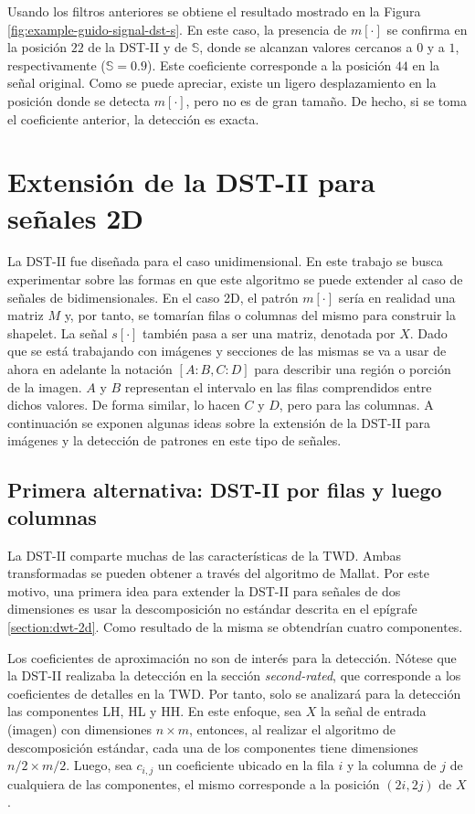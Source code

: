 Usando los filtros anteriores se obtiene el resultado mostrado en la Figura \ref{fig:example-guido-signal-dst-s}. 
En este caso, la presencia de $m[\cdot]$ se confirma en la posición $22$ de la DST-II y de $\mathbb{S}$, donde se alcanzan valores
cercanos a $0$ y a $1$, respectivamente ($\mathbb{S}=0.9$). Este coeficiente corresponde a la posición 
$44$ en la señal original. Como se puede apreciar, existe un ligero desplazamiento en la posición donde se detecta $m[\cdot]$,
pero no es de gran tamaño. De hecho, si se toma el coeficiente anterior, la detección es exacta.

\section{Extensión de la DST-II para señales 2D}\label{section:2d}

La DST-II fue diseñada para el caso unidimensional. En este trabajo se busca experimentar sobre las formas en que
este algoritmo se puede extender al caso de señales de bidimensionales. 
En el caso 2D, el patrón $m[\cdot]$ sería en realidad
una matriz $M$ y, por tanto, se tomarían filas o columnas del mismo para construir la shapelet.
La señal $s[\cdot]$ también pasa a ser una matriz, denotada por $X$.
Dado que se está trabajando con imágenes y secciones de las mismas se va a usar de ahora en adelante la notación
$[A:B,C:D]$ para describir una región o porción de la imagen. $A$ y $B$ representan el intervalo en las filas
comprendidos entre dichos valores. De forma similar, lo hacen $C$ y $D$, pero para las columnas.
A continuación se exponen algunas ideas sobre la extensión de la DST-II para imágenes y la detección de patrones en este tipo de señales.

\subsection{Primera alternativa: DST-II por filas y luego columnas}

La DST-II comparte muchas de las características de la TWD. Ambas transformadas se pueden obtener a través del
algoritmo de Mallat. Por este motivo, una primera idea para extender la DST-II para señales de dos dimensiones
es usar la descomposición no estándar descrita en el epígrafe \ref{section:dwt-2d}.
Como resultado de la misma se obtendrían cuatro componentes. 

Los coeficientes de aproximación no son de interés para la detección. Nótese que la DST-II realizaba la detección en la sección
\textit{second-rated}, que corresponde a los coeficientes de detalles en la TWD. Por tanto, solo se analizará para
la detección las componentes LH, HL y HH.
En este enfoque, sea $X$ la señal de entrada (imagen) con dimensiones $n\times m$, entonces, al realizar el algoritmo de descomposición estándar,
cada una de los componentes tiene dimensiones $n/2 \times m/2$. Luego, sea $c_{i,j}$ un coeficiente
ubicado en la fila $i$ y la columna de $j$ de cualquiera de las componentes, el mismo corresponde
a la posición $(2i,2j)$ de $X$.

